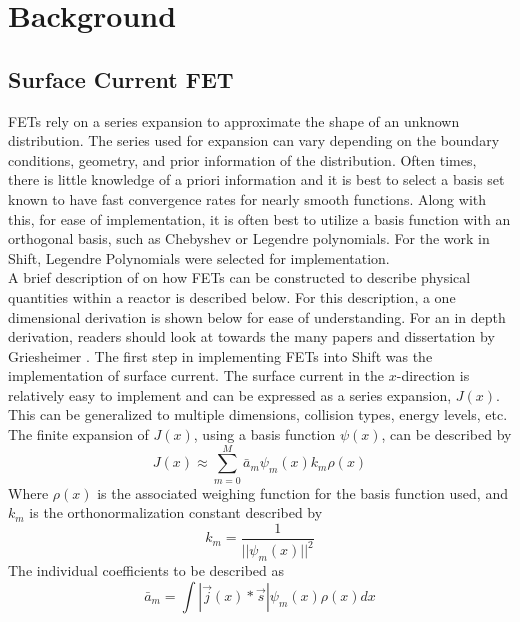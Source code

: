 \documentclass[10tma4paper]{article}
\begin{document}
\section{Background}\label{background}

\subsection{Surface Current FET}\label{Surface Current FET}

FETs rely on a series expansion to approximate the shape of an unknown distribution. The series used for expansion can vary depending on the boundary conditions, geometry, and prior information of the distribution. Often times, there is little knowledge of a priori information and it is best to select a basis set known to have fast convergence rates for nearly smooth functions. Along with this, for ease of implementation, it is often best to utilize a basis function with an orthogonal basis, such as Chebyshev or Legendre polynomials. For the work in Shift, Legendre Polynomials were selected for implementation.
\\
A brief description of on how FETs can be constructed to describe physical quantities within a reactor is described below. For this description, a one dimensional derivation is shown below for ease of understanding. For an in depth derivation, readers should look at towards the many papers and dissertation by Griesheimer \cite{FETThesis}\cite{2DFET}. The first step in implementing FETs into Shift was the implementation of surface current. The surface current in the $x$-direction is relatively easy to implement and can be expressed as a series expansion, $J(x)$. This can be generalized to multiple dimensions, collision types, energy levels, etc. The finite expansion of $J(x)$, using a basis function $\psi(x)$, can be described by
	\begin{equation} \label{eq:current approx}
	J(x) \approx \sum_{m=0}^{M}\bar{a}_{m}\psi_{m}(x)k_{m}\rho(x)
	\end{equation}
Where $\rho(x)$ is the associated weighing function for the basis function used, and $k_{m}$ is the orthonormalization constant described by
\begin{equation}\label{eq:ortho const}
k_{m} = \frac{1}{||\psi_{m}(x)||^{2}}
\end{equation} 
The individual coefficients to be described as
	 \begin{equation} \label{eq:a bar m}
	\bar{a}_{m}=\int |\vec{j}(x)*\vec{s}|\psi_{m}(x)\rho(x)dx
	 \end{equation}
\end{document}
